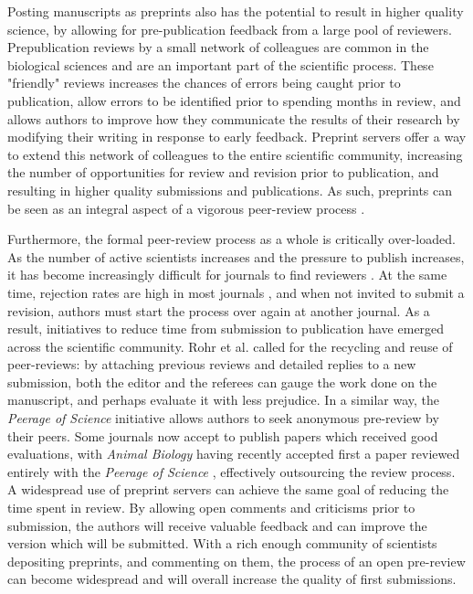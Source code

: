 \documentclass[letterpaper,twocolumn,superscriptaddress,showkeys,longbibliography]{revtex4-1}
\begin{document}
Posting manuscripts as preprints also has the potential to result in higher
quality science, by allowing for pre-publication feedback
from a large pool of reviewers. Prepublication reviews by a small network of
colleagues are common in the biological sciences and are an important part of
the scientific process. These "friendly" reviews increases the chances of errors
being caught prior to publication, allow errors to be identified
prior to spending months in review, and allows authors to improve how they
communicate the results of their research by modifying their writing in response
to early feedback. Preprint servers offer a way to extend this network of
colleagues to the entire scientific
community, increasing the number of opportunities for review and revision
prior to publication, and resulting in higher quality submissions and publications.
As such, preprints can be seen as an
integral aspect of a vigorous peer-review process \cite{hoc12}. 

Furthermore, the formal peer-review process as a whole is critically over-loaded. As
the number of active scientists increases and the pressure to publish
increases, it has become increasingly difficult for journals to find
reviewers \cite{hoc09}.  At the same time, rejection rates are high in most journals
\cite{aar08,roh09}, and when not invited to submit a revision, authors must start the
process over again at another journal. As a result, initiatives to reduce time from submission to
publication have emerged across the scientific community. Rohr et al.
\cite{roh09} called for the recycling and reuse of peer-reviews:
by attaching previous reviews and detailed replies to a new submission, both
the editor and the referees can gauge the work done on the manuscript, and
perhaps evaluate it with less prejudice. In a similar way, the \emph{Peerage
of Science} initiative allows authors to seek anonymous pre-review by their
peers. Some journals now accept to publish papers which received good
evaluations, with \emph{Animal Biology} having recently accepted first a paper
reviewed entirely with the \emph{Peerage of Science} \cite{abb12}, effectively
outsourcing the review process. A widespread use of preprint servers can
achieve the same goal of reducing the time spent in review. By allowing
open comments and criticisms prior to submission, the authors will receive valuable
feedback and can improve the version which will be submitted. With a rich
enough community of scientists depositing preprints, and commenting on them,
the process of an open pre-review can become widespread and will overall
increase the quality of first submissions.
\end{document}
